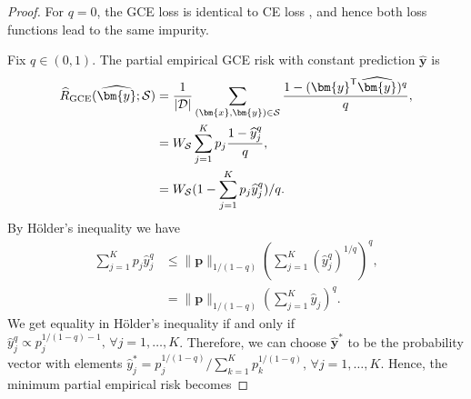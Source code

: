 \documentclass[letterpaper]{article} %
\newcommand{\bx}{{\bm{x}}}
\newcommand{\bp}{{\bm{p}}}
\newcommand{\by}{{\bm{y}}}
\newcommand{\T}{{\mathsf{T}}}
\newcommand{\cS}{{\cal{S}}}
\newcommand{\cD}{{\cal{D}}}
\newcommand{\WS}{{W_{\cal{S}}}}
\begin{document}
\begin{proof}
    \medskip{}
    For $q=0$, the GCE loss is identical to CE loss \cite{zhang2018generalized}, and hence both loss functions lead to the same impurity.

    Fix $q\in(0,1)$. The partial empirical GCE risk with constant prediction $\widehat{\by}$ is
    \begin{align*}
        \widehat{R}_{\mathrm{GCE}}(\widehat{\by};\cS) &= \frac{1}{|\cD|} \sum_{(\bx,\by)\in\cS} \frac{1-(\by^\T\widehat{\by})^q}{q},
        \\
        &= \WS\sum_{j=1}^K p_j \frac{1-\widehat{y}_j^q}{q},
        \\
        &= \WS (
        1-\sum_{j=1}^K p_j \widehat{y}_j^q
        )/q.
    \end{align*}
    By H\"{o}lder's inequality we have
    \begin{align*}
        \sum_{j=1}^K p_j\widehat{y}_j^q
        &\leq \|\bp\|_{1/(1-q)} \left( \sum_{j=1}^K (\widehat{y}_j^{q})^{1/q} \right)^{q},
        \\
        &= \|\bp\|_{1/(1-q)} \left( \sum_{j=1}^K \widehat{y}_j \right)^{q}.
    \end{align*}
    We get equality in H\"older's inequality if and only if
    $\widehat{y}_j^q \propto p_j^{1/(1-q)-1},\,\forall j=1,\ldots,K$.
    Therefore, we can choose $\widehat{\by}^*$ to be the probability vector with elements
    $\widehat{y}_j^* = p_j^{1/(1-q)}/\sum_{k=1}^K p_k^{1/(1-q)},\,\forall j=1,\ldots,K$. Hence, the minimum partial empirical risk becomes

\end{proof}
\end{document}
